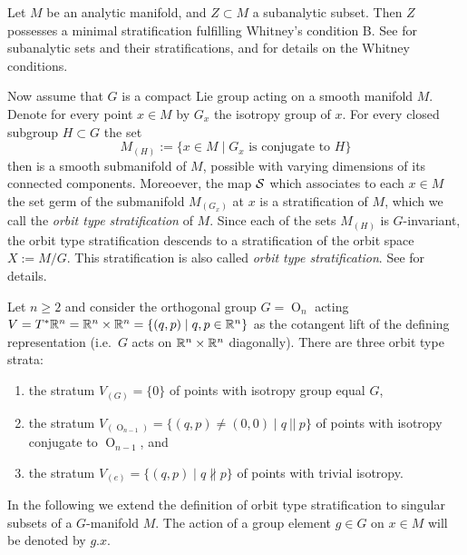 \begin{example}
  Let $M$ be an analytic manifold, and $Z \subset M$ a subanalytic subset. 
  Then $Z$ possesses a minimal stratification fulfilling Whitney's condition B. 
  See \cite{BieMilSSS,BekRSSS} for subanalytic sets and their stratifications, and \cite{PflAGSSS} for 
  details on the Whitney conditions.  
\end{example}

Now assume that $G$ is a compact Lie group acting on a smooth manifold $M$. 
Denote for every point $x\in M$ by $G_x$ the isotropy group of $x$. 
For every closed subgroup $H \subset G$ the set 
\[
 M_{(H)} := \{ x \in M \mid G_x \text{ is conjugate to } H \}
\]
then is a smooth submanifold of $M$, possible with varying dimensions of its 
connected components. Moreoever, the map $\mathcal{S}$ which associates
to each $x\in M$ the set germ of the submanifold 
$M_{(G_x)}$ at $x$ is a stratification of $M$, which we call the 
\emph{orbit type stratification} of $M$. Since each of the sets $M_{(H)}$ is 
$G$-invariant, the orbit type stratification descends
to a stratification of the orbit space $X := M/G$. This stratification is
also called \emph{orbit type stratification}. See \cite[Sec.~4.3]{PflAGSSS} 
for details. 

\begin{example} Let $n\ge 2$ and consider the orthogonal group $G=\operatorname{O}_n$ acting $V=T^*\mathbb{R}^n=\mathbb{R}^n\times \mathbb{R}^n=\{(q, p)\mid q, p\in \mathbb{R}^n\}$ as the cotangent lift of the defining representation (i.e.~$G$ acts on $\mathbb{R}^n\times \mathbb{R}^n$ diagonally). There are three orbit type strata:
\begin{enumerate}
\item the stratum $V_{(G)}=\{0\}$ of points with isotropy group equal $G$, 
\item the stratum $V_{(\operatorname{O}_{n-1})}=\{(q,p)\ne (0,0) \mid q\:||\: p\}$ of points with isotropy conjugate to $\operatorname{O}_{n-1}$, and
\item the stratum $V_{(e)}=\{(q,p) \mid q \nparallel p\}$ of points with trivial isotropy.
\end{enumerate}
\end{example}

In the following we extend the definition of orbit type stratification to 
singular subsets of a $G$-manifold $M$. The action of a group element $g\in G$ on $x\in M$ will be denoted by
$g.x$. 

